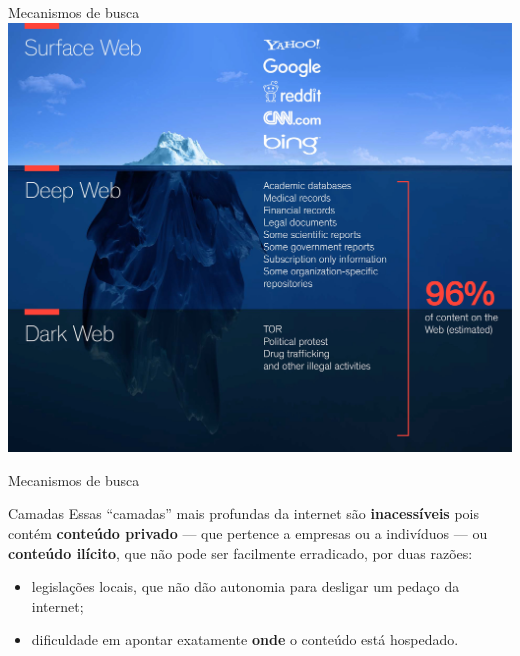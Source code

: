 \begin{frame}{Mecanismos de busca}
	\centering
	\includegraphics[width=0.7\linewidth]{Figuras/Ch03/fig8}
\end{frame}


\begin{frame}{Mecanismos de busca}
	\begin{block}{Camadas}
		Essas ``camadas'' mais profundas da internet são \textbf{inacessíveis} pois contém \textbf{conteúdo privado} --- que pertence a empresas ou a indivíduos --- ou \textbf{conteúdo ilícito}, que não pode ser facilmente erradicado, por duas razões:
		\begin{itemize}
			\item legislações locais, que não dão autonomia para desligar um pedaço da internet;
			\item dificuldade em apontar exatamente \textbf{onde} o conteúdo está hospedado.
		\end{itemize}
	\end{block}

\end{frame}


